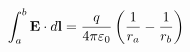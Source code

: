 \documentclass[preview]{standalone}
\begin{document}
\begin{align*}
\special{dvisvgm:raw <g id='unique000'>}\int_a^b\mathbf E\cdot d\mathbf l=\frac{q}{4\pi\varepsilon_0}\left(\frac{1}{r_a}-\frac{1}{r_b}\right)\special{dvisvgm:raw </g>}
\end{align*}
\end{document}
